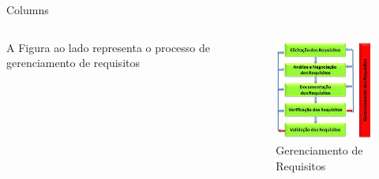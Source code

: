 \documentclass{beamer}
\begin{document}
  \begin{frame}{Columns}
   \begin{columns}
     A Figura ao lado representa o processo de gerenciamento de requisitos
     \begin{figure}
     \centering
     \includegraphics[width=5cm,height=5cm\textwidth]{figuras/requisitos}
     \caption{Gerenciamento de Requisitos}
     \end{figure}
    \end{columns}
  \end{frame}
\end{document}
